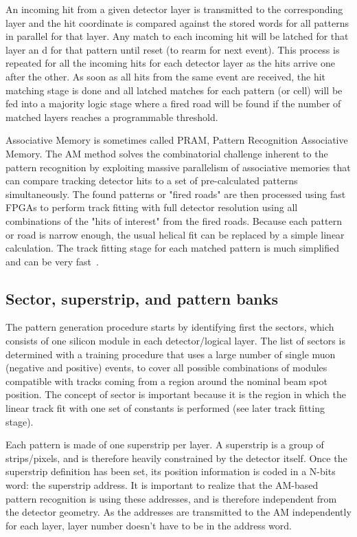 \noindent An incoming hit from a given detector layer is transmitted to the corresponding layer and the hit coordinate is compared against the stored words for all patterns in parallel for that layer. Any match to each incoming hit will be latched for that layer an
d for that pattern until reset (to rearm for next event). This process is repeated for all the incoming hits for each detector layer as the hits arrive one after the other. As soon as all hits from the same event are received, the hit matching stage is done and all latched matches for each pattern (or cell) will be fed into a majority logic stage where a fired road will be found if the number of matched layers reaches a programmable threshold. 
 

\noindent Associative Memory is sometimes called PRAM, Pattern Recognition Associative Memory. The AM method solves the combinatorial challenge inherent to the pattern recognition by exploiting massive parallelism of associative memories that can compare tracking detector hits to a set of pre-calculated patterns simultaneously. The found patterns or "fired roads" are then processed using fast FPGAs to perform track fitting with full detector resolution using all combinations of the "hits of interest" from the fired roads. Because each pattern or road is narrow enough, the usual helical fit can be replaced by a simple linear calculation. The track fitting stage for each matched pattern is much simplified and can be very fast~\cite{bib:Ann-09}.

\subsection{Sector, superstrip, and pattern banks}

\noindent The pattern generation procedure starts by identifying first the sectors, which consists of one silicon module in each detector/logical layer. The list of sectors is determined with a training procedure that uses a large number of single muon (negative and positive) events, to cover all possible combinations of modules compatible with tracks coming from a region around the nominal beam spot position. The concept of sector is important because it is the region in which the linear track fit with one set of constants is performed (see later track fitting stage).

\noindent Each pattern is made of one superstrip per layer. A superstrip is a group of strips/pixels, and is therefore heavily constrained by the detector itself. Once the superstrip definition has been set, its position information is coded in a N-bits word: the superstrip address. It is important to realize that the AM-based pattern recognition is using these addresses, and is therefore independent from the detector geometry. As the addresses are transmitted to the AM independently for each layer, layer number doesn't have to be in the address word. 

